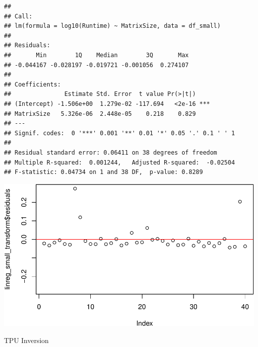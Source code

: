 \documentclass[
]{article}
\newenvironment{Shaded}{\begin{snugshade}}{\end{snugshade}}
\newcommand{\DataTypeTok}[1]{\textcolor[rgb]{0.13,0.29,0.53}{#1}}
\newcommand{\DecValTok}[1]{\textcolor[rgb]{0.00,0.00,0.81}{#1}}
\newcommand{\KeywordTok}[1]{\textcolor[rgb]{0.13,0.29,0.53}{\textbf{#1}}}
\newcommand{\NormalTok}[1]{#1}
\newcommand{\OperatorTok}[1]{\textcolor[rgb]{0.81,0.36,0.00}{\textbf{#1}}}
\newcommand{\StringTok}[1]{\textcolor[rgb]{0.31,0.60,0.02}{#1}}
\begin{document}
\begin{verbatim}
## 
## Call:
## lm(formula = log10(Runtime) ~ MatrixSize, data = df_small)
## 
## Residuals:
##       Min        1Q    Median        3Q       Max 
## -0.044167 -0.028197 -0.019721 -0.001056  0.274107 
## 
## Coefficients:
##               Estimate Std. Error  t value Pr(>|t|)    
## (Intercept) -1.506e+00  1.279e-02 -117.694   <2e-16 ***
## MatrixSize   5.326e-06  2.448e-05    0.218    0.829    
## ---
## Signif. codes:  0 '***' 0.001 '**' 0.01 '*' 0.05 '.' 0.1 ' ' 1
## 
## Residual standard error: 0.06411 on 38 degrees of freedom
## Multiple R-squared:  0.001244,   Adjusted R-squared:  -0.02504 
## F-statistic: 0.04734 on 1 and 38 DF,  p-value: 0.8289
\end{verbatim}

\begin{Shaded}
\end{Shaded}

\includegraphics{main_files/figure-latex/unnamed-chunk-18-3.pdf}

TPU Inversion
\end{document}

